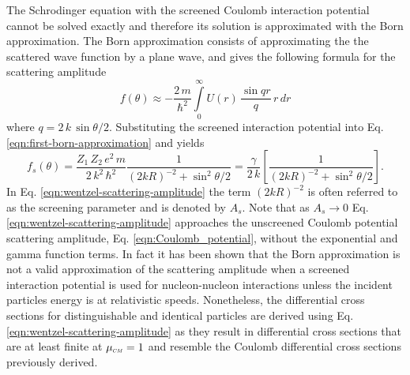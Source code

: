 The Schrodinger equation with the screened Coulomb interaction potential cannot be solved exactly and therefore its solution is approximated with the Born approximation. The Born approximation consists of approximating the the scattered wave function by a plane wave, and gives the following formula for the scattering amplitude
\begin{equation} \label{eqn:first-born-approximation}
    f(\theta) \approx - \dfrac{2 \, m}{\hbar^2} \int\limits_0^{\infty} U(r) \, \dfrac{\sin qr}{q} \, r \, dr
\end{equation}
where $q = 2 \, k \, \sin \theta / 2$. Substituting the screened interaction potential into Eq. \eqref{eqn:first-born-approximation} and yields
\begin{equation} \label{eqn:wentzel-scattering-amplitude}
    f_s(\theta) = \dfrac{Z_1 \, Z_2 \, e^2 \, m}{2 \, k^2 \, \hbar^2} \dfrac{1}{(2kR)^{-2} + \sin^2 \theta/2} = \dfrac{\gamma}{2 \, k} \left[\dfrac{1}{(2kR)^{-2} + \sin^2 \theta/2}\right].
\end{equation}
In Eq. \eqref{eqn:wentzel-scattering-amplitude} the term $(2kR)^{-2}$ is often referred to as the screening parameter and is denoted by $A_s$. Note that as $A_s \rightarrow 0$ Eq. \eqref{eqn:wentzel-scattering-amplitude} approaches the unscreened Coulomb potential scattering amplitude, Eq. \eqref{eqn:Coulomb_potential}, without the exponential and gamma function terms. In fact it has been shown that the Born approximation is not a valid approximation of the scattering amplitude when a screened interaction potential is used for nucleon-nucleon interactions unless the incident particles energy is at relativistic speeds. Nonetheless, the differential cross sections for distinguishable and identical particles are derived using Eq. \eqref{eqn:wentzel-scattering-amplitude} as they result in differential cross sections that are at least finite at $\mucm = 1$ and resemble the Coulomb differential cross sections previously derived.

